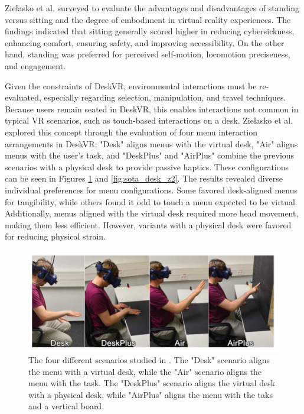     Zielasko et al. \cite{zielaskoSitNotSit2021} surveyed to evaluate the advantages and disadvantages of standing versus sitting and the degree of embodiment in virtual reality experiences. The findings indicated that sitting generally scored higher in reducing cybersickness, enhancing comfort, ensuring safety, and improving accessibility. On the other hand, standing was preferred for perceived self-motion, locomotion preciseness, and engagement.

    Given the constraints of DeskVR, environmental interactions must be re-evaluated, especially regarding selection, manipulation, and travel techniques. Because users remain seated in DeskVR, this enables interactions not common in typical VR scenarios, such as touch-based interactions on a desk. Zielasko et al. \cite{zielaskoMenusDeskSystem2019} explored this concept through the evaluation of four menu interaction arrangements in DeskVR: "Desk" aligns menus with the virtual desk, "Air" aligns menus with the user's task, and "DeskPlus" and "AirPlus" combine the previous scenarios with a physical desk to provide passive haptics. These configurations can be seen in Figures \ref{fig:sota_desk_z} and \ref{fig:sota_desk_z2}. The results revealed diverse individual preferences for menu configurations. Some favored desk-aligned menus for tangibility, while others found it odd to touch a menu expected to be virtual. Additionally, menus aligned with the virtual desk required more head movement, making them less efficient. However, variants with a physical desk were favored for reducing physical strain.
    
    \begin{figure}[h!]
        \centering
        \includegraphics[width=0.85\linewidth]{figures/menu_desk.png}
        \caption{The four different scenarios studied in \cite{zielaskoMenusDeskSystem2019}. The "Desk" scenario aligns the menu with a virtual desk, while the "Air" scenario aligns the menu with the task. The "DeskPlus" scenario aligns the virtual desk with a physical desk, while "AirPlus" aligns the menu with the taks and a vertical board.  }
        \label{fig:sota_desk_z}
    \end{figure}

